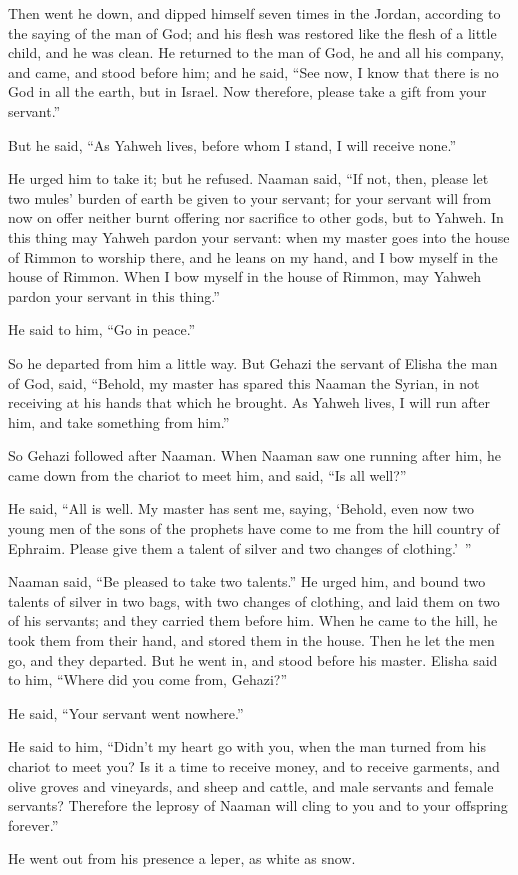 {\par }{\PP {}Then went he down, and dipped himself seven times in the Jordan, according to the saying of the man of God; and his flesh was restored like the flesh of a little child, and he was clean.
He returned to the man of God, he and all his company, and came, and stood before him; and he said, “See now, I know that there is no God in all the earth, but in Israel. Now therefore, please take a gift from your servant.”
\par }{\PP {}But he said, “As Yahweh lives, before whom I stand, I will receive none.”
\par }{\PP He urged him to take it; but he refused.
Naaman said, “If not, then, please let two mules’ burden of earth be given to your servant; for your servant will from now on offer neither burnt offering nor sacrifice to other gods, but to Yahweh.
In this thing may Yahweh pardon your servant: when my master goes into the house of Rimmon to worship there, and he leans on my hand, and I bow myself in the house of Rimmon. When I bow myself in the house of Rimmon, may Yahweh pardon your servant in this thing.”
\par }{\PP {}He said to him, “Go in peace.”
\par }{\PP So he departed from him a little way.
But Gehazi the servant of Elisha the man of God, said, “Behold, my master has spared this Naaman the Syrian, in not receiving at his hands that which he brought. As Yahweh lives, I will run after him, and take something from him.”
\par }{\PP {}So Gehazi followed after Naaman. When Naaman saw one running after him, he came down from the chariot to meet him, and said, “Is all well?”
\par }{\PP {}He said, “All is well. My master has sent me, saying, ‘Behold, even now two young men of the sons of the prophets have come to me from the hill country of Ephraim. Please give them a talent of silver and two changes of clothing.’ ”
\par }{\PP {}Naaman said, “Be pleased to take two talents.” He urged him, and bound two talents of silver in two bags, with two changes of clothing, and laid them on two of his servants; and they carried them before him.
When he came to the hill, he took them from their hand, and stored them in the house. Then he let the men go, and they departed.
But he went in, and stood before his master. Elisha said to him, “Where did you come from, Gehazi?”
\par }{\PP He said, “Your servant went nowhere.”
\par }{\PP {}He said to him, “Didn’t my heart go with you, when the man turned from his chariot to meet you? Is it a time to receive money, and to receive garments, and olive groves and vineyards, and sheep and cattle, and male servants and female servants?
Therefore the leprosy of Naaman will cling to you and to your offspring forever.”
\par }{\PP He went out from his presence a leper, as white as snow.

}

